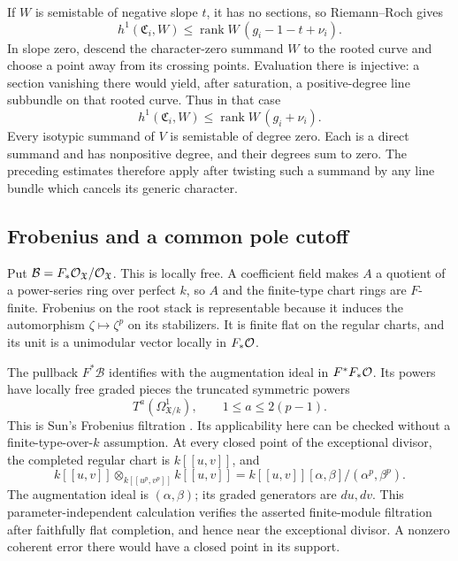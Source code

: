 If $W$ is semistable of negative slope $t$, it has no sections, so Riemann--Roch gives
\begin{equation}\label{eq:curve-bound}
 h^1(\mathfrak C_i,W)\leq
 \operatorname{rank}W\,(g_i-1-t+\nu_i).
\end{equation}
In slope zero, descend the character-zero summand $W$ to the rooted
curve and choose a point away from its crossing points. Evaluation
there is injective: a section vanishing there would yield, after
saturation, a positive-degree line subbundle on that rooted curve. Thus in that case
\begin{equation}\label{eq:curve-zero}
 h^1(\mathfrak C_i,W)\leq
 \operatorname{rank}W\,(g_i+\nu_i).
\end{equation}
Every isotypic summand of $V$ is semistable of degree zero. Each is a direct summand and has nonpositive degree, and their degrees sum to zero. The preceding estimates therefore apply after twisting such a summand by any line bundle which cancels its generic character.

\subsection{Frobenius and a common pole cutoff}

Put $\mathcal B=F_*\mathcal O_{\mathfrak X}/\mathcal O_{\mathfrak X}$. This is locally free. A coefficient field makes $A$ a quotient of a power-series ring over perfect $k$, so $A$ and the finite-type chart rings are $F$-finite. Frobenius on the root stack is representable because it induces the automorphism $\zeta\mapsto\zeta^p$ on its stabilizers. It is finite flat on the regular charts, and its unit is a unimodular vector locally in $F_*\mathcal O$.

The pullback $F^*\mathcal B$ identifies with the augmentation ideal in $F^*F_*\mathcal O$. Its powers have locally free graded pieces the truncated symmetric powers
\[
 T^a(\Omega^1_{\mathfrak X/k}),\qquad 1\leq a\leq2(p-1).
\]
This is Sun's Frobenius filtration \cite[Theorem 3.7, author pp.~12--13]{Sun}. Its applicability here can be checked without a finite-type-over-$k$ assumption. At every closed point of the exceptional divisor, the completed regular chart is $k[[u,v]]$, and
\[
 k[[u,v]]\otimes_{k[[u^p,v^p]]}k[[u,v]]
       =k[[u,v]][\alpha,\beta]/(\alpha^p,\beta^p).
\]
The augmentation ideal is $(\alpha,\beta)$; its graded generators are $du,dv$. This parameter-independent calculation verifies the asserted finite-module filtration after faithfully flat completion, and hence near the exceptional divisor. A nonzero coherent error there would have a closed point in its support.

